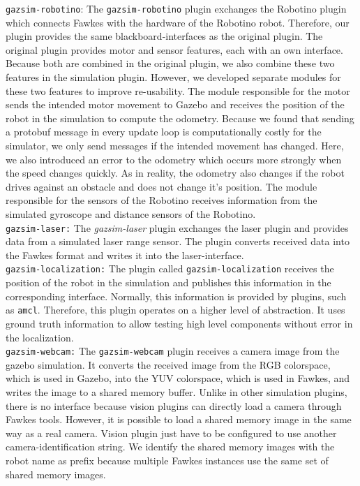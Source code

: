 \texttt{gazsim-robotino}:
The \texttt{gazsim-robotino} plugin exchanges the Robotino plugin which connects Fawkes with the hardware of the Robotino robot. Therefore, our plugin provides the same blackboard-interfaces as the original plugin. The original plugin provides motor and sensor features, each with an own interface. Because both are combined in the original plugin, we also combine these two features in the simulation plugin. However, we developed separate modules for these two features to improve re-usability. The module responsible for the motor sends the intended motor movement to Gazebo and receives the position of the robot in the simulation to compute the odometry. Because we found that sending a protobuf message in every update loop is computationally costly for the simulator, we only send messages if the intended movement has changed. Here, we also introduced an error to the odometry which occurs more strongly when the speed changes quickly. As in reality, the odometry also changes if the robot drives against an obstacle and does not change it's position. The module responsible for the sensors of the Robotino receives information from the simulated gyroscope and distance sensors of the Robotino.\\

\texttt{gazsim-laser:}
The \textit{gazsim-laser} plugin exchanges the laser plugin and provides data from a simulated laser range sensor. The plugin converts received data into the Fawkes format and writes it into the laser-interface.\\

\texttt{gazsim-localization:}
The plugin called \texttt{gazsim-localization} receives the position of the robot in the simulation and publishes this information in the corresponding interface. Normally, this information is provided by plugins, such as \texttt{amcl}. Therefore, this plugin operates on a higher level of abstraction. It uses ground truth information to allow testing high level components without error in the localization. \\

\texttt{gazsim-webcam:}
The \texttt{gazsim-webcam} plugin receives a camera image from the gazebo simulation. It converts the received image from the RGB colorspace, which is used in Gazebo, into the YUV colorspace, which is used in Fawkes, and writes the image to a shared memory buffer. Unlike in other simulation plugins, there is no interface because vision plugins can directly load a camera through Fawkes tools. However, it is possible to load a shared memory image in the same way as a real camera. Vision plugin just have to be configured to use another camera-identification string. We identify the shared memory images with the robot name as prefix because multiple Fawkes instances use the same set of shared memory images. %
\\

